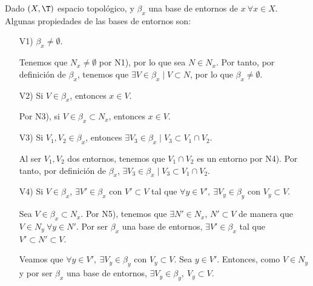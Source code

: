 Dado $(X,\T)$ espacio topológico, y $\beta_x$ una base de entornos de $x~\forall x\in X$. Algunas propiedades de las bases de entornos son:
\begin{enumerate}
    \item[V1)] $\beta_x\neq \emptyset$.

    Tenemos que $N_x\neq \emptyset$ por N1), por lo que sea $N\in N_x$. Por tanto, por definición de $\beta_x$, tenemos que $\exists V\in \beta_x\mid V\subset N$, por lo que $\beta_x\neq \emptyset$.
    
    \item[V2)] Si $V\in \beta_x$, entonces $x\in V$.

    Por N3), si $V\in \beta_x\subset N_x$, entonces $x\in V$.
    
    \item[V3)] Si $V_1,V_2\in \beta_x$, entonces $\exists V_3\in \beta_x\mid V_3\subset V_1\cap V_2$.

    Al ser $V_1, V_2$ dos entornos, tenemos que $V_1\cap V_2$ es un entorno por N4). Por tanto, por definición de $\beta_x$, $\exists V_3\in \beta_x\mid V_3\subset V_1\cap V_2$.

    \item[V4)] Si $V\in \beta_x$, $\exists V'\in \beta_x$ con $V'\subset V$ tal que $\forall y\in V',~\exists V_y\in \beta_y$ con $V_y\subset V$.

    Sea $V\in \beta_x\subset N_x$. Por N5), tenemos que $\exists N'\in N_x$, $N'\subset V$ de manera que $V\in N_y~\forall y\in N'$. Por ser $\beta_x$ una base de entornos, $\exists V'\in \beta_x$ tal que $V'\subset N'\subset V$.

    Veamos que $\forall y\in V',~\exists V_y\in \beta_y$ con $V_y\subset V$. Sea $y\in V'$. Entonces, como $V\in N_y$ y por ser $\beta_x$ una base de entornos, $\exists V_y\in \beta_y,~V_y\subset V$.
\end{enumerate}

